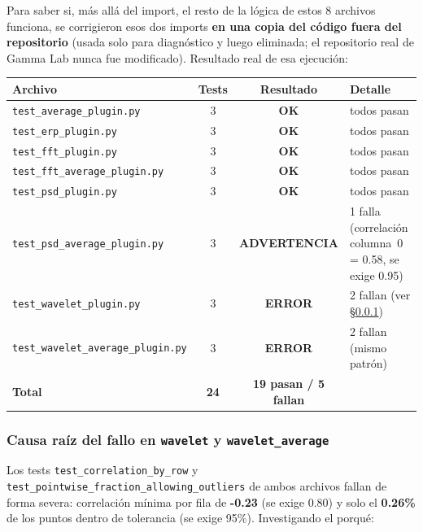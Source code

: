 \documentclass[11pt,a4paper]{article}
\newcommand{\okmark}{\textcolor{ok}{\textbf{OK}}}
\newcommand{\errmark}{\textcolor{critico}{\textbf{ERROR}}}
\newcommand{\warnmark}{\textcolor{advertencia}{\textbf{ADVERTENCIA}}}
\begin{document}
Para saber si, más allá del import, el resto de la lógica de estos 8 archivos funciona, se corrigieron esos
dos imports \textbf{en una copia del código fuera del repositorio} (usada solo para diagnóstico y luego
eliminada; el repositorio real de Gamma Lab nunca fue modificado). Resultado real de esa ejecución:

\begin{center}
\begin{tabular}{lccl}
\toprule
\textbf{Archivo} & \textbf{Tests} & \textbf{Resultado} & \textbf{Detalle} \\
\midrule
\texttt{test\_\allowbreak average\_\allowbreak plugin.py} & 3 & \okmark & todos pasan \\
\texttt{test\_\allowbreak erp\_\allowbreak plugin.py} & 3 & \okmark & todos pasan \\
\texttt{test\_\allowbreak fft\_\allowbreak plugin.py} & 3 & \okmark & todos pasan \\
\texttt{test\_\allowbreak fft\_\allowbreak average\_\allowbreak plugin.py} & 3 & \okmark & todos pasan \\
\texttt{test\_\allowbreak psd\_\allowbreak plugin.py} & 3 & \okmark & todos pasan \\
\texttt{test\_\allowbreak psd\_\allowbreak average\_\allowbreak plugin.py} & 3 & \warnmark & 1 falla (correlación columna~0 = 0.58, se exige 0.95) \\
\texttt{test\_\allowbreak wavelet\_\allowbreak plugin.py} & 3 & \errmark & 2 fallan (ver \S\ref{sec:wavelet-root-cause}) \\
\texttt{test\_\allowbreak wavelet\_\allowbreak average\_\allowbreak plugin.py} & 3 & \errmark & 2 fallan (mismo patrón) \\
\midrule
\textbf{Total} & \textbf{24} & \textbf{19 pasan / 5 fallan} & \\
\bottomrule
\end{tabular}
\end{center}

\subsubsection{Causa raíz del fallo en \texttt{wavelet} y \texttt{wavelet\_\allowbreak average}}
\label{sec:wavelet-root-cause}

Los tests \texttt{test\_\allowbreak correlation\_\allowbreak by\_\allowbreak row} y \texttt{test\_\allowbreak pointwise\_\allowbreak fraction\_\allowbreak allowing\_\allowbreak outliers} de
ambos archivos fallan de forma severa: correlación mínima por fila de \textbf{-0.23} (se exige 0.80) y solo
el \textbf{0.26\%} de los puntos dentro de tolerancia (se exige 95\%). Investigando el porqué:
\end{document}

